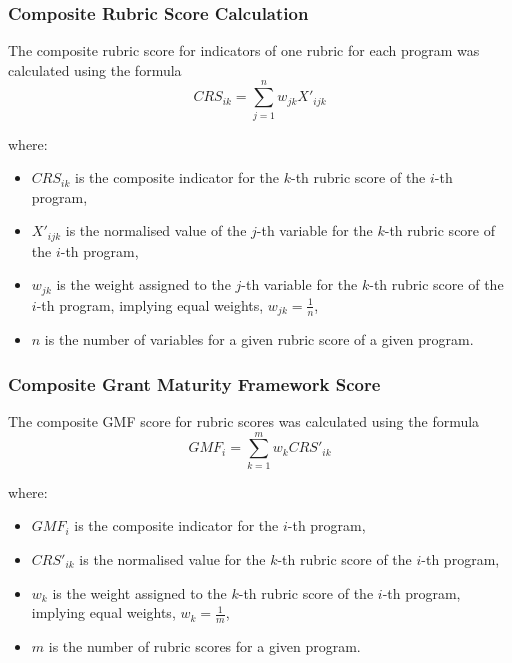 \documentclass[conference]{IEEEtran}
\begin{document}
\subsubsection{Composite Rubric Score Calculation}\label{sec_3.2.1}

The composite rubric score for indicators of one rubric for each program was calculated using the formula
\footnotesize
\[
CRS_{ik} = \sum_{j=1}^{n} w_{jk} X'_{ijk}
\]

where:

\begin{itemize}
    \item \( CRS_{ik} \) is the composite indicator for the \( k \)-th rubric score of the \( i \)-th program,
    \item \( X'_{ijk} \) is the normalised value of the \( j \)-th variable for the \( k \)-th rubric score of the \( i \)-th program,
    \item \( w_{jk} \) is the weight assigned to the \( j \)-th variable for the \( k \)-th rubric score of the \( i \)-th program, implying equal weights, \( w_{jk} = \frac{1}{n} \),
    \item \( n \) is the number of variables for a given rubric score of a given program.
\end{itemize}\vspace{7pt}
\normalsize
\subsubsection{Composite Grant Maturity Framework Score}\label{sec_3.2.2}
The composite GMF score for rubric scores was calculated using the formula
\footnotesize
\[
GMF_i = \sum_{k=1}^{m} w_k CRS'_{ik}
\]

where:

\begin{itemize}
    \item \( GMF_i \) is the composite indicator for the \( i \)-th program,
    \item \( CRS'_{ik} \) is the normalised value for the \( k \)-th rubric score of the \( i \)-th program,
    \item \( w_k \) is the weight assigned to the \( k \)-th rubric score of the \( i \)-th program, implying equal weights, \( w_k = \frac{1}{m} \),
    \item \( m \) is the number of rubric scores for a given program.
\end{itemize}\vspace{7pt}
\normalsize
\end{document}
